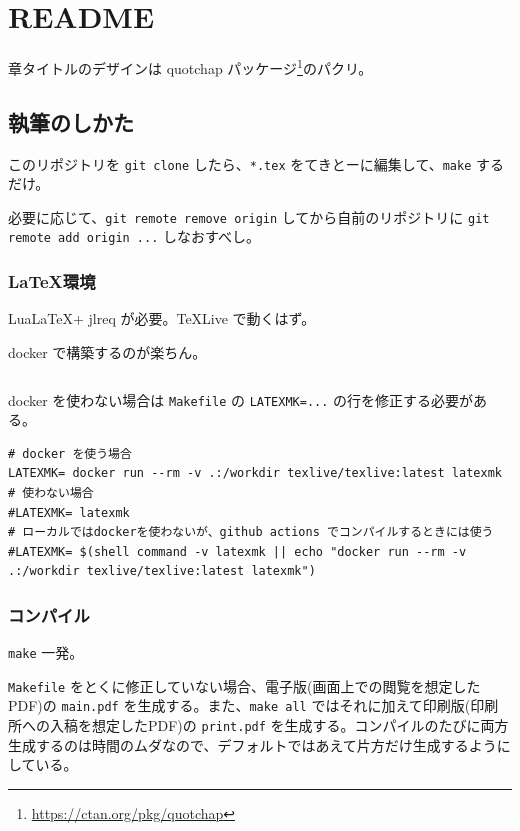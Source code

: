 \chapter{README}

章タイトルのデザインは quotchap パッケージ\footnote{\url{https://ctan.org/pkg/quotchap}}のパクリ。

\section{執筆のしかた}

このリポジトリを \verb`git clone` したら、\verb`*.tex` をてきとーに編集して、\verb`make` するだけ。

必要に応じて、\verb`git remote remove origin` してから自前のリポジトリに \verb`git remote add origin ...` しなおすべし。

\subsection{\LaTeX 環境}

Lua\LaTeX + jlreq が必要。\TeX Live で動くはず。

docker で構築するのが楽ちん。

\begin{lstlisting}[style=tty]
% docker pull texlive/texlive:latest
\end{lstlisting}

docker を使わない場合は \verb`Makefile` の \verb`LATEXMK=...` の行を修正する必要がある。

\begin{lstlisting}
# docker を使う場合
LATEXMK= docker run --rm -v .:/workdir texlive/texlive:latest latexmk
# 使わない場合
#LATEXMK= latexmk
# ローカルではdockerを使わないが、github actions でコンパイルするときには使う
#LATEXMK= $(shell command -v latexmk || echo "docker run --rm -v .:/workdir texlive/texlive:latest latexmk")
\end{lstlisting}

\subsection{コンパイル}

\verb`make` 一発。

\verb`Makefile` をとくに修正していない場合、電子版(画面上での閲覧を想定したPDF)の \verb`main.pdf` を生成する。また、\verb`make all` ではそれに加えて印刷版(印刷所への入稿を想定したPDF)の \verb`print.pdf` を生成する。コンパイルのたびに両方生成するのは時間のムダなので、デフォルトではあえて片方だけ生成するようにしている。

